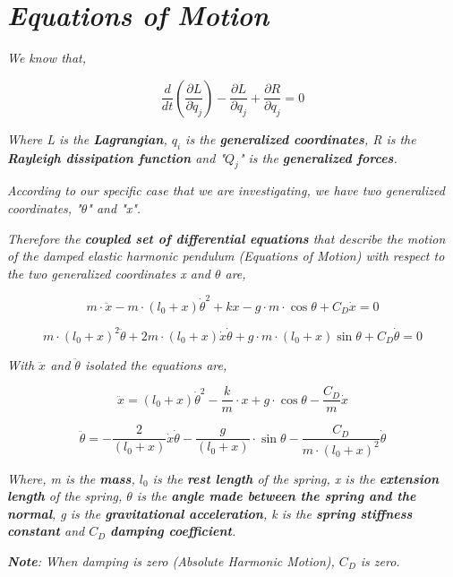 
\section{\textit{Equations of Motion}}
            
    \textit{We know that,}
            
        $$\frac{d}{dt}\left(\frac{\partial L}{\partial \dot{q}_j}\right) - \frac{\partial L}{\partial q_j} + \frac{\partial R}{\partial q_j} = 0$$
            
    \textit{Where L is the \textbf{Lagrangian}, $q_i$ is the \textbf{generalized coordinates}, R is the \textbf{Rayleigh dissipation function} and "$Q_j$" is the \textbf{generalized forces}.}
            
    \textit{According to our specific case that we are investigating, we have two generalized coordinates, "$\theta$" and "x".}        
            
    \textit{Therefore the \textbf{coupled set of differential equations} that describe the motion of the damped elastic harmonic pendulum (Equations of Motion) with respect to the two generalized coordinates x and $\theta$ are,}
            
        $$m\cdot\ddot{x} -m\cdot(l_0+x)\dot{\theta}^2 + kx - g\cdot m\cdot\cos{\theta} + C_D\dot{x} = 0$$
            
        $$m\cdot(l_0+x)^2\ddot{\theta} + 2m\cdot(l_0+x)\dot{x}\dot{\theta} + g\cdot m\cdot(l_0+x)\sin{\theta} + C_D\dot{\theta} = 0$$
            
    \textit{With $\ddot{x}$ and $\ddot{\theta}$ isolated the equations are,}
            
        $$\ddot{x} = (l_0+x)\dot{\theta}^2 - \frac{k}{m}\cdot x + g\cdot\cos{\theta} - \frac{C_D}{m}\dot{x}$$
            
        $$\ddot{\theta} = - \frac{2}{(l_0+x)}\dot{x}\dot{\theta} - \frac{g}{(l_0+x)}\cdot\sin{\theta} - \frac{C_D}{m\cdot(l_0+x)^2}\dot{\theta}$$
            
    \textit{Where, m is the \textbf{mass}, $l_0$ is the \textbf{rest length} of the spring, x is the \textbf{extension length} of the spring, $\theta$ is the \textbf{angle made between the spring and the normal}, g is the \textbf{gravitational acceleration}, k is the \textbf{spring stiffness constant} and $C_D$ \textbf{damping coefficient}.}
            
    \textit{\textbf{Note}: When damping is zero (Absolute Harmonic Motion), $C_D$ is zero.}
            
